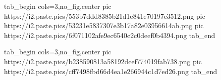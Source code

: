  
 
 
 
 
\zzSecCmtScr

\ifcmt
  tab_begin cols=3,no_fig,center
	     pic https://i2.paste.pics/553b7ddd8385b21d1e841e70197e3512.png
			 pic https://i2.paste.pics/53231e5837307e3b17a82e03956614ab.png
			 pic https://i2.paste.pics/6f071102afe9ec6540c2c0deef0b4394.png
  tab_end
\fi

\ifcmt
  tab_begin cols=3,no_fig,center
		pic https://i2.paste.pics/b238590813a58192dcef774019fab738.png
		pic https://i2.paste.pics/cff7498fbd66d4ea1e266944c1d7ed26.png
  tab_end
\fi
